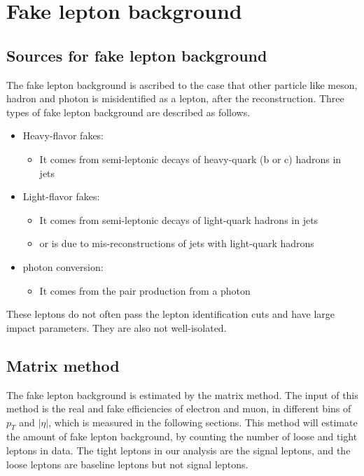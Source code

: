 \section{Fake lepton background}
\label{sec:fake_background}
\subsection{Sources for fake lepton background}
The fake lepton background is ascribed to the case that other particle like meson, hadron and photon is misidentified as a lepton, after the reconstruction.
Three types of fake lepton background are described as follows.
\begin{itemize}
\item Heavy-flavor fakes:
\begin{itemize}
\item It comes from semi-leptonic decays of heavy-quark (b or c) hadrons in jets
\end{itemize}
\item Light-flavor fakes:
\begin{itemize}
\item It comes from semi-leptonic decays of light-quark hadrons in jets
\item or is due to mis-reconstructions of jets with light-quark hadrons
\end{itemize}
\item photon conversion:
\begin{itemize}
\item It comes from the pair production from a photon
\end{itemize}
\end{itemize}
These leptons do not often pass the lepton identification cuts and have large impact parameters.
They are also not well-isolated.

\subsection{Matrix method}
The fake lepton background is estimated by the matrix method.
The input of this method is the real and fake efficiencies of electron and muon, in different bins of $p_T$ and $|\eta|$, which is measured in the following sections.
This method will estimate the amount of fake lepton background, by counting the number of loose and tight leptons in data.
The tight leptons in our analysis are the signal leptons, and the loose leptons are baseline leptons but not signal leptons.

